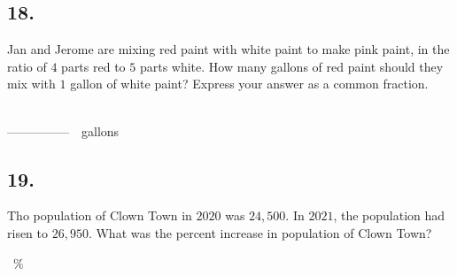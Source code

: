 \documentclass[12pt]{article}
\begin{document}
\subsection*{18.}
Jan and Jerome are mixing red paint with white paint to make pink paint, in the ratio of $4$ parts red to $5$ parts white. How many gallons of red paint should they mix with $1$ gallon of white paint? Express your answer as a common fraction. 

\nopagebreak

\begin{minipage}[b]{\linewidth}
\fbox{\phantom{ANSWER}}\\
\mbox{---------------}~~gallons\\
\fbox{\phantom{ANSWER}}
\end{minipage}

\begin{answer}
%
\end{answer}


\subsection*{19.}
Tho population of Clown Town in $2020$ was $24,500$. In $2021$, the population had risen to $26,950$. What was the percent increase in population of Clown Town?

\nopagebreak

\fbox{\phantom{ANSWER}}~\%

\begin{answer}
%
\end{answer}
\end{document}
